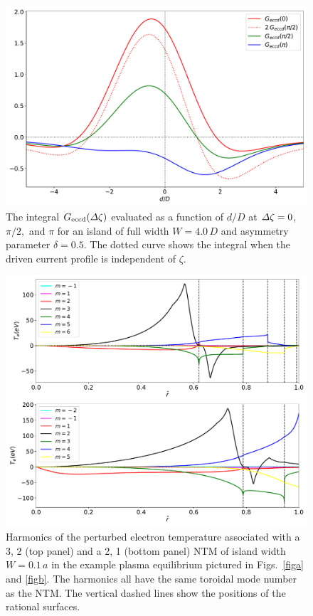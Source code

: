 \documentclass[12pt,prb,aps]{revtex4-1}
\begin{document}
\begin{figure}
\centerline{\includegraphics[width=\textwidth]{Fig11.pdf}}
\caption{The integral $G_{\rm eccd}({\mit\Delta}\zeta)$ evaluated as a function of $d/D$ at ${\mit\Delta}\zeta = 0$, $\pi/2,$ and $\pi$ for an  island
of full width $W=4.0\,D$ and asymmetry parameter $\delta=0.5$. The dotted curve shows the integral when the driven current profile is independent of $\zeta$.\label{fig9}}
\end{figure}

\begin{figure}
\centerline{\includegraphics[width=\textwidth]{Fig12.pdf}}
\caption{Harmonics of the perturbed electron temperature associated with a 3, 2 (top panel) and a 2, 1 (bottom panel) NTM of island width $W=0.1\,a$ in the example plasma equilibrium pictured in Figs.~\ref{figa}
and \ref{figb}. The harmonics all have the same toroidal mode number as the NTM. The vertical dashed lines show the positions of the rational surfaces. \label{fig10}}
\end{figure}
\end{document}
